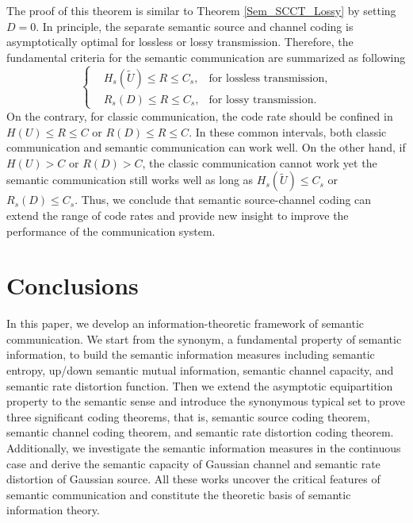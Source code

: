 \documentclass[12pt, draftclsnofoot,onecolumn]{IEEEtran}
\begin{document}
The proof of this theorem is similar to Theorem \ref{Sem_SCCT_Lossy} by setting $D=0$. In principle, the separate semantic source and channel coding is asymptotically optimal for lossless or lossy transmission. Therefore, the fundamental criteria for the semantic communication are summarized as following
\begin{equation}
\left\{
\begin{aligned}
& H_s({\tilde{U}})\leq R \leq C_s,   &\text{for lossless transmission,}\\
& R_s(D) \leq R \leq C_s,                &\text{for lossy transmission.}
\end{aligned}
\right.
\end{equation}
On the contrary, for classic communication, the code rate should be confined in $H(U)\leq R \leq C$ or $R(D)\leq R \leq C$. In these common intervals, both classic communication and semantic communication can work well. On the other hand, if $H(U)>C$ or $R(D)>C$, the classic communication cannot work yet the semantic communication still works well as long as $H_s(\tilde{U})\leq C_s$ or $R_s(D)\leq C_s$. Thus, we conclude that semantic source-channel coding can extend the range of code rates and provide new insight to improve the performance of the communication system.

\section{Conclusions}
\label{section_XI}
In this paper, we develop an information-theoretic framework of semantic communication. We start from the synonym, a fundamental property of semantic information, to build the semantic information measures including semantic entropy, up/down semantic mutual information, semantic channel capacity, and semantic rate distortion function. Then we extend the asymptotic equipartition property to the semantic sense and introduce the synonymous typical set to prove three significant coding theorems, that is, semantic source coding theorem, semantic channel coding theorem, and semantic rate distortion coding theorem. Additionally, we investigate the semantic information measures in the continuous case and derive the semantic capacity of Gaussian channel and semantic rate distortion of Gaussian source. All these works uncover the critical features of semantic communication and constitute the theoretic basis of semantic information theory.
\end{document}
